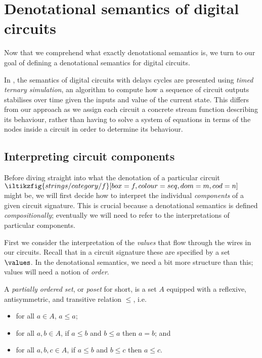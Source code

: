 \section{Denotational semantics of digital circuits}

Now that we comprehend what exactly denotational semantics is, we turn to our
goal of defining a denotational semantics for digital circuits.

\begin{remark}
    In \cite{mendler2012constructive}, the semantics of digital circuits with
    delays cycles are presented using \emph{timed ternary simulation}, an
    algorithm to compute how a sequence of circuit outputs stabilises over time
    given the inputs and value of the current state.
    This differs from our approach as we assign each circuit a concrete stream
    function describing its behaviour, rather than having to solve a system of
    equations in terms of the nodes inside a circuit in order to determine its
    behaviour.
\end{remark}

\subsection{Interpreting circuit components}

Before diving straight into what the denotation of a particular circuit \(
    \iltikzfig{strings/category/f}[box=f,colour=seq,dom=m,cod=n]
\) might be, we will first decide how to interpret the individual
\emph{components} of a given circuit signature.
This is crucial because a denotational semantics is defined
\emph{compositionally}; eventually we will need to refer to the interpretations
of particular components.

First we consider the interpretation of the \emph{values} that flow through the
wires in our circuits.
Recall that in a circuit signature these are specified by a set \(\values\).
In the denotational semantics, we need a bit more structure than this; values
will need a notion of \emph{order}.

\begin{definition}
    A \emph{partially ordered set}, or \emph{poset} for short, is a set \(A\)
    equipped with a reflexive, antisymmetric, and transitive relation \(\leq\),
    i.e.\
    \begin{itemize}
        \item for all \(a \in A\), \(a \leq a\);
        \item for all \(a, b \in A\), if \(a \leq b\) and \(b \leq a\) then
                \(a = b\); and
        \item for all \(a, b, c \in A\), if \(a \leq b\) and \(b \leq c\) then
                \(a \leq c\).
    \end{itemize}
\end{definition}

